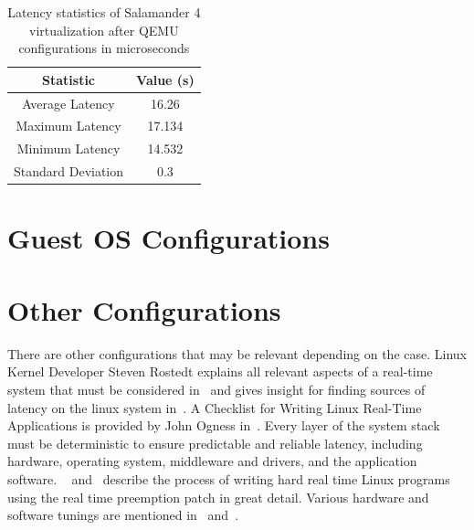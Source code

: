 \documentclass[MMR,Master,english]{twbook}
\begin{document}
\begin{table}[H]
	\centering
	\caption[Latency statistics of Salamander 4 after QEMU configurations]{Latency statistics of Salamander 4 virtualization after QEMU configurations in microseconds}
	\label{tab:latency_statistics_qemu}
	\setlength{\tabcolsep}{0.5em} %
	{\renewcommand{\arraystretch}{1.2}%
		\begin{tabular}{|c|c|}\hline
			\textbf{Statistic} & \textbf{Value (\textmu s)} \\\hline
			Average Latency    & 16.26                      \\\hline
			Maximum Latency    & 17.134                     \\\hline
			Minimum Latency    & 14.532                     \\\hline
			Standard Deviation & 0.3                        \\\hline
		\end{tabular}}
\end{table}


\section{Guest OS Configurations}


\section{Other Configurations}
There are other configurations that may be relevant depending on the case. Linux Kernel Developer Steven Rostedt explains all relevant aspects of a real-time system that must be considered in~\cite{kernelrecipesKernelRecipes20162016} and gives insight for finding sources of latency on the linux system in~\cite{thelinuxfoundationFindingSourcesLatency2020}. A Checklist for Writing Linux Real-Time Applications is provided by John Ogness in~\cite{thelinuxfoundationChecklistWritingLinux2020}. Every layer of the system stack must be deterministic to ensure predictable and reliable latency, including hardware, operating system, middleware and drivers, and the application software. ~\cite{HOWTOBuildRTapplication} and~\cite{RealtimeProgrammingLinux} describe the process of writing hard real time Linux programs using the real time preemption patch in great detail. Various hardware and software tunings are mentioned in~\cite{KVMQemuVirtualization} and~\cite{RealTimePerformanceTuning2022}.

\clearpage
\end{document}
